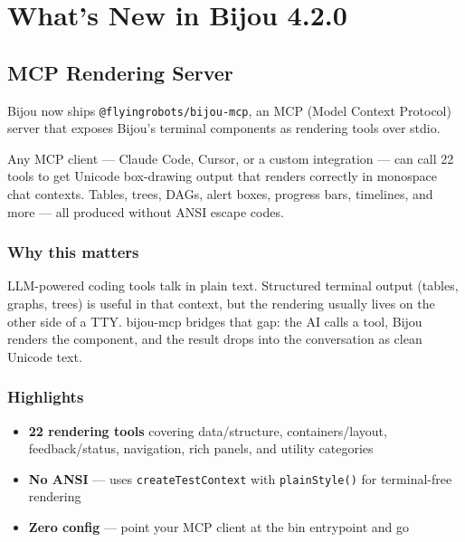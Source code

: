 \chapter{What's New in Bijou 4.2.0}\label{record-276}

\smallskip

\section{MCP Rendering Server}\label{record-276-mcp-rendering-server}

Bijou now ships \texttt{@\allowbreak{}f\allowbreak{}l\allowbreak{}y\allowbreak{}i\allowbreak{}n\allowbreak{}g\allowbreak{}r\allowbreak{}o\allowbreak{}b\allowbreak{}o\allowbreak{}t\allowbreak{}s\allowbreak{}/\allowbreak{}b\allowbreak{}i\allowbreak{}j\allowbreak{}o\allowbreak{}u\allowbreak{}-\allowbreak{}m\allowbreak{}c\allowbreak{}p}, an MCP (Model Context Protocol) server that exposes Bijou's terminal components as rendering tools over stdio.

Any MCP client --- Claude Code, Cursor, or a custom integration --- can call 22 tools to get Unicode box-drawing output that renders correctly in monospace chat contexts. Tables, trees, DAGs, alert boxes, progress bars, timelines, and more --- all produced without ANSI escape codes.

\subsection{Why this matters}\label{record-276-why-this-matters}

LLM-powered coding tools talk in plain text. Structured terminal output (tables, graphs, trees) is useful in that context, but the rendering usually lives on the other side of a TTY. bijou-mcp bridges that gap: the AI calls a tool, Bijou renders the component, and the result drops into the conversation as clean Unicode text.

\subsection{Highlights}\label{record-276-highlights}

\begin{itemize}
\tightlist
\item
  \textbf{22 rendering tools} covering data/structure, containers/layout, feedback/status, navigation, rich panels, and utility categories
\item
  \textbf{No ANSI} --- uses \texttt{c\allowbreak{}r\allowbreak{}e\allowbreak{}a\allowbreak{}t\allowbreak{}e\allowbreak{}T\allowbreak{}e\allowbreak{}s\allowbreak{}t\allowbreak{}C\allowbreak{}o\allowbreak{}n\allowbreak{}t\allowbreak{}e\allowbreak{}x\allowbreak{}t} with \texttt{p\allowbreak{}l\allowbreak{}a\allowbreak{}i\allowbreak{}n\allowbreak{}S\allowbreak{}t\allowbreak{}y\allowbreak{}l\allowbreak{}e\allowbreak{}(\allowbreak{})} for terminal-free rendering
\item
  \textbf{Zero config} --- point your MCP client at the bin entrypoint and go
\end{itemize}

